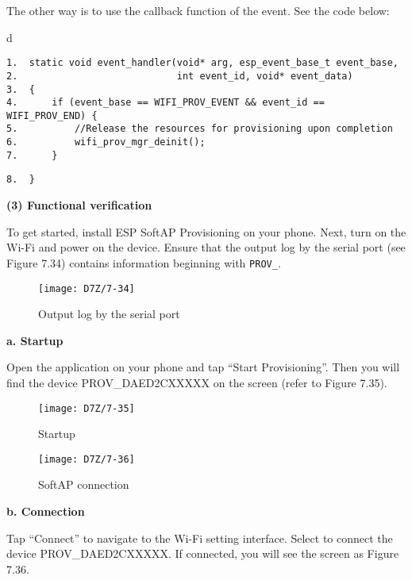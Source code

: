\documentclass[a4paper,12pt]{book}
\begin{document}
The other way is to use the callback function of the event. See the code below:

\begin{codebloc}
\begin{tabular}{d}
\vspace{2pt}
\begin{verbatim}
1.  static void event_handler(void* arg, esp_event_base_t event_base,
2.                            int event_id, void* event_data)
3.  {
4.      if (event_base == WIFI_PROV_EVENT && event_id == WIFI_PROV_END) {
5.          //Release the resources for provisioning upon completion
6.          wifi_prov_mgr_deinit();
7.      }
\end{verbatim}
\verb|8.  }|
\end{tabular}
\end{codebloc}

\textbf{(3) Functional verification}

To get started, install ESP SoftAP Provisioning on your phone. Next, turn on the Wi-Fi and power on the device. Ensure that the output log by the serial port (see Figure 7.34) contains information beginning with \verb|PROV_|. 


\begin{figure}[!h]
    \centering
    \texttt{[image: D7Z/7-34]}
    \caption{Output log by the serial port}
\end{figure}

\textbf{a. Startup}

Open the application on your phone and tap “Start Provisioning”. Then you will find the device PROV\_DAED2CXXXXX on the screen (refer to Figure 7.35).

\begin{figure}[!h]
  \Centering
  \begin{minipage}[b]{0.4\textwidth}
    \texttt{[image: D7Z/7-35]}
    \caption{Startup}
  \end{minipage}\hspace{1em}
  \begin{minipage}[b]{0.4\textwidth}
    \texttt{[image: D7Z/7-36]}
    \caption{SoftAP connection}
  \end{minipage}
\end{figure}

\textbf{b. Connection}

Tap “Connect” to navigate to the Wi-Fi setting interface. Select to connect the device PROV\_DAED2CXXXXX. If connected, you will see the screen as Figure 7.36.
\end{document}
